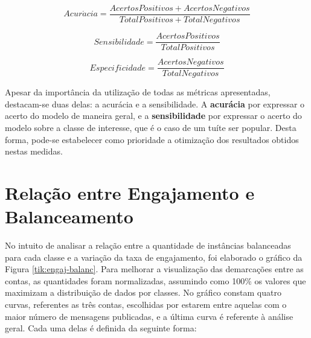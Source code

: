 \documentclass[oneside,openright,12pt]{ufsm_2015} %
\begin{document}
    \begin{equation} \label{eq:acuracidade}
    Acur\acute{a}cia = \frac{AcertosPositivos + AcertosNegativos}{TotalPositivos + TotalNegativos}
    \end{equation}
    
    \begin{equation} \label{eq:sensibilidade}
    Sensibilidade = \frac{AcertosPositivos}{TotalPositivos}
    \end{equation}
    
    \begin{equation} \label{eq:especificidade}
    Especificidade = \frac{AcertosNegativos}{TotalNegativos}
    \end{equation}
    
    
    
    \par Apesar da importância da utilização de todas as métricas apresentadas, destacam-se duas delas: a acurácia e a sensibilidade. A \textbf{acurácia} por expressar o acerto do modelo de maneira geral, e a \textbf{sensibilidade} por expressar o acerto do modelo sobre a classe de interesse, que é o caso de um tuíte ser popular. Desta forma, pode-se estabelecer como prioridade a otimização dos resultados obtidos nestas medidas.
    

\section{Relação entre Engajamento e Balanceamento}
\label{sec:exp-engaj-balanc}

    \par No intuito de analisar a relação entre a quantidade de instâncias balanceadas para cada classe e a variação da taxa de engajamento, foi elaborado o gráfico da Figura \ref{tik:engaj-balanc}. Para melhorar a visualização das demarcações entre as contas, as quantidades foram normalizadas, assumindo como 100\% os valores que maximizam a distribuição de dados por classes. No gráfico constam quatro curvas, referentes as três contas, escolhidas por estarem entre aquelas com o maior número de mensagens publicadas, e a última curva é referente à análise geral. Cada uma delas é definida da seguinte forma: 
    
\end{document}
